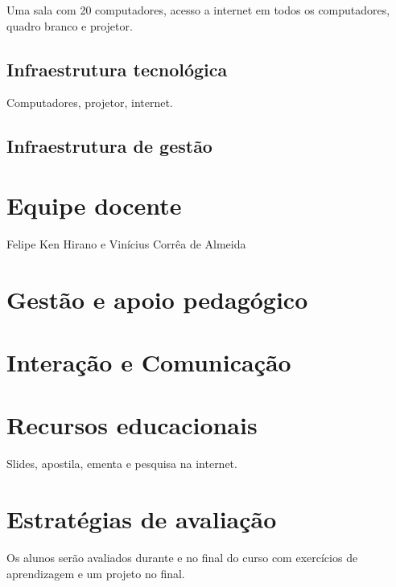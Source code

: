Uma sala com 20 computadores, acesso a internet em todos os computadores, quadro branco e projetor.

\subsection{Infraestrutura tecnológica}

Computadores, projetor, internet.

\subsection{Infraestrutura de gestão}

\section{Equipe docente}

Felipe Ken Hirano e Vinícius Corrêa de Almeida

\section{Gestão e apoio pedagógico}

\section{Interação e Comunicação}

\section{Recursos educacionais}

Slides, apostila, ementa e pesquisa na internet.

\section{Estratégias de avaliação}

Os alunos serão avaliados durante e no final do curso com exercícios de aprendizagem e um projeto no final. 
